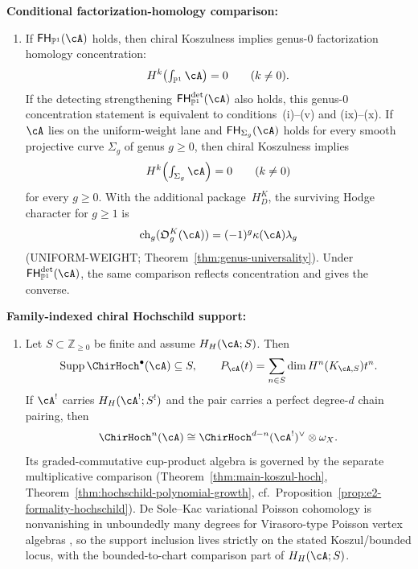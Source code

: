 \begin{theorem}
\smallskip
\noindent\textbf{Conditional factorization-homology comparison:}
\begin{enumerate}
\item[\textup{(vii)}] If
 $\mathsf{FH}_{\mathbb{P}^1}(\cA)$ holds, then chiral Koszulness
 implies genus-$0$ factorization homology concentration:
 \[
 H^k\!\left(\textstyle\int_{\mathbb{P}^1}\cA\right)=0
 \qquad (k \neq 0).
 \]
 If the detecting strengthening
 $\mathsf{FH}^{\mathrm{det}}_{\mathbb{P}^1}(\cA)$ also holds, this
 genus-$0$ concentration statement is equivalent to
 conditions~\textup{(i)--(v)} and \textup{(ix)--(x)}. If $\cA$
 lies on the uniform-weight lane and
 $\mathsf{FH}_{\Sigma_g}(\cA)$ holds for every smooth projective
 curve $\Sigma_g$ of genus $g \geq 0$, then chiral Koszulness
 implies
 \[
 H^k\!\left(\textstyle\int_{\Sigma_g}\cA\right)=0
 \qquad (k \neq 0)
 \]
 for every $g \geq 0$.  With the additional package~$H_D^K$, the
 surviving Hodge character for $g\ge1$ is
 \[
 \operatorname{ch}_g(\mathfrak O_g^K(\cA))
 =(-1)^g\kappa(\cA)\lambda_g
 \]
 \textup{(UNIFORM-WEIGHT; Theorem~\textup{\ref{thm:genus-universality})}.}
 Under $\mathsf{FH}^{\mathrm{det}}_{\mathbb{P}^1}(\cA)$, the same
 comparison reflects concentration and gives the converse.
\end{enumerate}

\smallskip
\noindent\textbf{Family-indexed chiral Hochschild support:}
\begin{enumerate}
\item[\textup{(viii)}] Let $S\subset\mathbb Z_{\geq0}$ be finite and
 assume $H_H(\cA;S)$.  Then
 \[
  \operatorname{Supp}\ChirHoch^\bullet(\cA)\subseteq S,
  \qquad
  P_\cA(t)=\sum_{n\in S}\dim H^n(K_{\cA,S})t^n.
 \]
 If $\cA^!$ carries $H_H(\cA^!;S^!)$ and the pair carries a perfect
 degree-$d$ chain pairing, then
 \[
  \ChirHoch^n(\cA)
  \cong \ChirHoch^{d-n}(\cA^!)^\vee \otimes \omega_X.
 \]
 Its graded-commutative cup-product algebra is governed by the separate
 multiplicative comparison
 \textup{(}Theorem~\textup{\ref{thm:main-koszul-hoch}},
 Theorem~\textup{\ref{thm:hochschild-polynomial-growth}},
 cf.\ Proposition~\textup{\ref{prop:e2-formality-hochschild}}\textup{)}.
 De Sole--Kac variational Poisson cohomology is nonvanishing in
 unboundedly many degrees for Virasoro-type Poisson vertex algebras
 \cite{BDSK21}, so the support inclusion lives strictly on the stated
 Koszul/bounded locus, with the bounded-to-chart comparison part of
 $H_H(\cA;S)$.
\end{enumerate}


\end{theorem}
